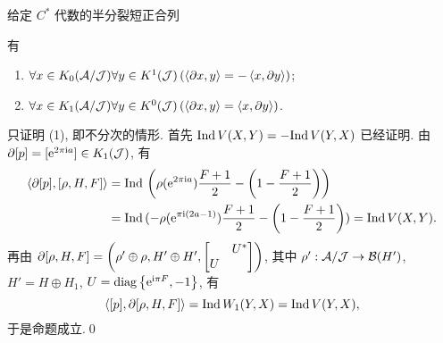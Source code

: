 \begin{Theorem}
	给定 $ C^* $ 代数的半分裂短正合列
	\begin{center}
	\end{center}
	有
	\begin{enumerate}
		\item $ \forall x\in K_0(\mathcal{A}/\mathcal{J})\forall y\in K^1(\mathcal{J})\,(\left\langle \partial x,y \right\rangle=-\left\langle x,\partial y \right\rangle) $;
		\item $ \forall x\in K_1(\mathcal{A}/\mathcal{J})\forall y\in K^0(\mathcal{J})\,(\left\langle \partial x,y \right\rangle=\left\langle x,\partial y \right\rangle) $.
	\end{enumerate}
\end{Theorem}
\begin{Proof}
	只证明 (1), 即不分次的情形. 首先 $ \mathrm{Ind}\, V(X,Y)=-\mathrm{Ind}\, V(Y,X) $ 已经证明. 由 $ \partial[p]=[\mathrm{e}^{2\pi\mathrm{i} a}]\in K_1(\mathcal{J}) $, 有
	\[
		\begin{aligned}
			\left\langle \partial[p],[\rho, H, F] \right\rangle&=\mathrm{Ind}\,\left(\rho(\mathrm{e}^{2\pi\mathrm{i} a})\frac{F+1}{2}-\left(1-\frac{F+1}{2}\right)\right)\\
			&=\mathrm{Ind}\,(-\rho(\mathrm{e}^{\pi\mathrm{i}(2a-1)})\frac{F+1}{2}-\left(1-\frac{F+1}{2}\right))=\mathrm{Ind}\, V(X,Y).
		\end{aligned}
	\]
	再由 $ \partial[\rho, H, F]=\left(\rho'\oplus\rho, H'\oplus H', \mqty[ & U^* \\ U &]\right) $, 其中 $ \rho' : \mathcal{A}/\mathcal{J}\to\mathcal{B}(H') $, $ H'=H\oplus H_1 $, $ U=\operatorname{diag}\left\{ \mathrm{e}^{\mathrm{i}\pi F},-1 \right\} $, 有
	\[
		\left\langle [p],\partial[\rho, H, F] \right\rangle=\mathrm{Ind}\, W_1(Y,X)=\mathrm{Ind}\, V(Y,X),
	\]
	于是命题成立.\qed
\end{Proof}